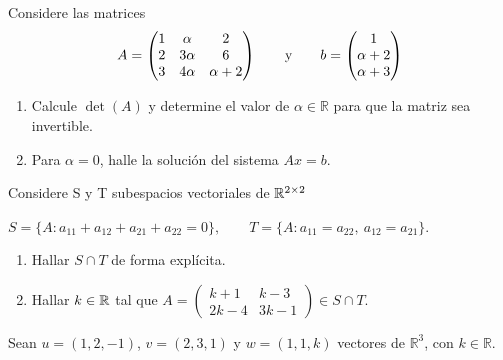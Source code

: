 \documentclass[10pt,a4]{examenEPN0}
\begin{document}
\encabezado
{}
\indicacionesPrueba
\begin{preguntas}



\item Considere las matrices 
\[
    A=\begin{pmatrix}
        1 & \alpha & 2 \\
        2 & 3\alpha & 6\\
        3 & 4\alpha & \alpha + 2
    \end{pmatrix} \qquad\text{y}\qquad 
    b=\begin{pmatrix}
        1\\\alpha + 2\\\alpha + 3    
    \end{pmatrix}
\]
\begin{enumerate}
    \item Calcule $\det(A)$ y determine el valor de $\alpha\in\mathbb{R}$ para que la matriz sea invertible. 
    \item Para $\alpha=0$, halle la solución del sistema $Ax=b$. 
    
\end{enumerate}

\item Considere S y T subespacios vectoriales de $\mathbb{R}^{2\times2}$
\begin{center}
$S=\{A : a_{11}+a_{12}+a_{21}+a_{22}=0\},\qquad
T=\{A : a_{11}=a_{22},\ a_{12}=a_{21}\}.$
\end{center}
\begin{enumerate}
\item Hallar $S\cap T$ de forma explícita. 
\item Hallar $k\in\mathbb{R}$ tal que $A=\begin{pmatrix}k+1&k-3\\2k-4&3k-1\end{pmatrix}\in S\cap T$. 
\end{enumerate}

\item Sean \(u = (1, 2, -1)\), \(v = (2, 3, 1)\) y \(w = (1, 1, k)\) vectores de \(\mathbb{R}^3\), con \(k \in \mathbb{R}\).


\end{preguntas}
\end{document}
